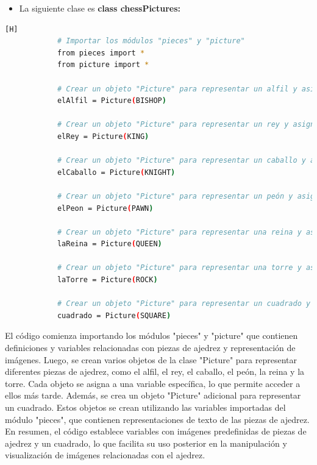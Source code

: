 \documentclass{article}
\begin{document}
 \clearpage

\begin{itemize}	
		\item La siguiente clase es \textbf{class chessPictures:} 
	\end{itemize}
	\begin{lstlisting}[language=bash,caption={Creación de objetos Picture para el alfil, el rey, el caballo, el peón, la reina y la torre}][H]
            # Importar los módulos "pieces" y "picture"
            from pieces import *
            from picture import *
            
            # Crear un objeto "Picture" para representar un alfil y asignarlo a la variable "elAlfil"
            elAlfil = Picture(BISHOP)
            
            # Crear un objeto "Picture" para representar un rey y asignarlo a la variable "elRey"
            elRey = Picture(KING)
            
            # Crear un objeto "Picture" para representar un caballo y asignarlo a la variable "elCaballo"
            elCaballo = Picture(KNIGHT)
            
            # Crear un objeto "Picture" para representar un peón y asignarlo a la variable "elPeon"
            elPeon = Picture(PAWN)
            
            # Crear un objeto "Picture" para representar una reina y asignarlo a la variable "laReina"
            laReina = Picture(QUEEN)
            
            # Crear un objeto "Picture" para representar una torre y asignarlo a la variable "laTorre"
            laTorre = Picture(ROCK)
            
            # Crear un objeto "Picture" para representar un cuadrado y asignarlo a la variable "cuadrado"
            cuadrado = Picture(SQUARE)
	\end{lstlisting}
El código comienza importando los módulos "pieces" y "picture" que contienen definiciones y variables relacionadas con piezas de ajedrez y representación de imágenes. Luego, se crean varios objetos de la clase "Picture" para representar diferentes piezas de ajedrez, como el alfil, el rey, el caballo, el peón, la reina y la torre. Cada objeto se asigna a una variable específica, lo que permite acceder a ellos más tarde. Además, se crea un objeto "Picture" adicional para representar un cuadrado. Estos objetos se crean utilizando las variables importadas del módulo "pieces", que contienen representaciones de texto de las piezas de ajedrez. En resumen, el código establece variables con imágenes predefinidas de piezas de ajedrez y un cuadrado, lo que facilita su uso posterior en la manipulación y visualización de imágenes relacionadas con el ajedrez.
\end{document}
